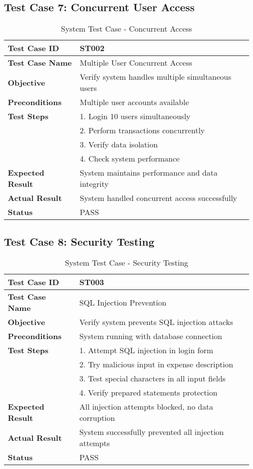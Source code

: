 \subsection{Test Case 7: Concurrent User Access}
\begin{table}[h]
\centering
\begin{tabular}{|p{3cm}|p{10cm}|}
\hline
\textbf{Test Case ID} & ST002 \\
\hline
\textbf{Test Case Name} & Multiple User Concurrent Access \\
\hline
\textbf{Objective} & Verify system handles multiple simultaneous users \\
\hline
\textbf{Preconditions} & Multiple user accounts available \\
\hline
\textbf{Test Steps} & 1. Login 10 users simultaneously\\
& 2. Perform transactions concurrently\\
& 3. Verify data isolation\\
& 4. Check system performance \\
\hline
\textbf{Expected Result} & System maintains performance and data integrity \\
\hline
\textbf{Actual Result} & System handled concurrent access successfully \\
\hline
\textbf{Status} & PASS \\
\hline
\end{tabular}
\caption{System Test Case - Concurrent Access}
\end{table}

\subsection{Test Case 8: Security Testing}
\begin{table}[h]
\centering
\begin{tabular}{|p{3cm}|p{10cm}|}
\hline
\textbf{Test Case ID} & ST003 \\
\hline
\textbf{Test Case Name} & SQL Injection Prevention \\
\hline
\textbf{Objective} & Verify system prevents SQL injection attacks \\
\hline
\textbf{Preconditions} & System running with database connection \\
\hline
\textbf{Test Steps} & 1. Attempt SQL injection in login form\\
& 2. Try malicious input in expense description\\
& 3. Test special characters in all input fields\\
& 4. Verify prepared statements protection \\
\hline
\textbf{Expected Result} & All injection attempts blocked, no data corruption \\
\hline
\textbf{Actual Result} & System successfully prevented all injection attempts \\
\hline
\textbf{Status} & PASS \\
\hline
\end{tabular}
\caption{System Test Case - Security Testing}
\end{table}

